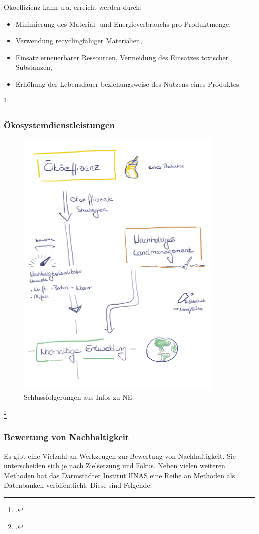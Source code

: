 \documentclass{scrartcl}
\begin{document}
Ökoeffizienz kann u.a. erreicht werden durch:
\begin{itemize}
\item Minimierung des Material- und Energieverbrauchs pro Produktmenge,
\item Verwendung recyclingfähiger Materialien,
\item Einsatz erneuerbarer Ressourcen, Vermeidung des Einsatzes toxischer Substanzen,
\item Erhöhung der Lebensdauer beziehungsweise des Nutzens eines Produktes.
\end{itemize}\footcite{OkoeffizienzBrockhaus.de}





\subsubsection{Ökosystemdienstleistungen}

\begin{figure}[htbp]
\centering
\includegraphics[width=10cm]{image_folder/NE_folgerungen.png}
\caption{Schlussfolgerungen aus Infos zu NE}
\label{fig:Folgerung_NE}
\end{figure}\footcite{Eigene Darstellung}

\subsubsection{Bewertung von Nachhaltigkeit}
Es gibt eine Vielzahl an Werkzeugen zur Bewertung von Nachhaltigkeit. Sie unterscheiden sich je nach Zielsetzung und Fokus. Neben vielen weiteren Methoden hat das Darmstädter Institut IINAS eine Reihe an Methoden als Datenbanken veröffentlicht. Diese sind Folgende:
\end{document}
